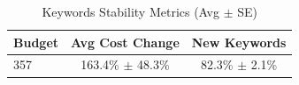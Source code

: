 \begin{table}[htbp]
\centering
\caption{Keywords Stability Metrics (Avg $\pm$ SE)}
\begin{tabular}{lcc}
\toprule
Budget & Avg Cost Change & New Keywords \\
\midrule
357 & 163.4\% $\pm$ 48.3\% & 82.3\% $\pm$ 2.1\% \\
\bottomrule
\end{tabular}
\end{table}